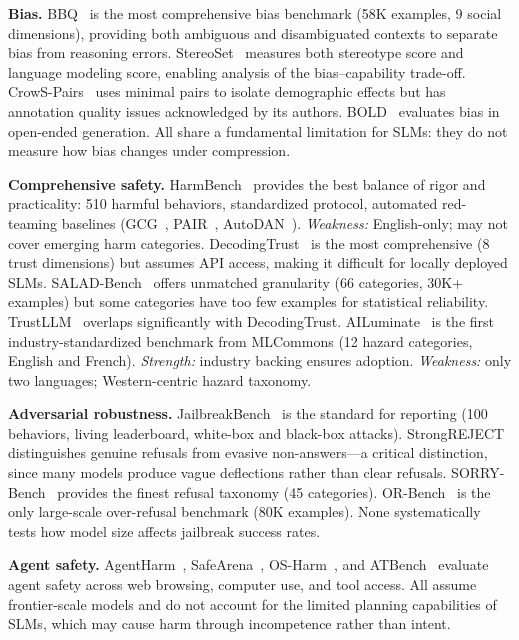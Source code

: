 \documentclass[12pt,a4paper]{article}
\begin{document}
\textbf{Bias.} BBQ~\citep{parrish2022bbq} is the most comprehensive bias benchmark (58K examples, 9 social dimensions), providing both ambiguous and disambiguated contexts to separate bias from reasoning errors. StereoSet~\citep{nadeem2021stereoset} measures both stereotype score and language modeling score, enabling analysis of the bias--capability trade-off. CrowS-Pairs~\citep{nangia2020crows} uses minimal pairs to isolate demographic effects but has annotation quality issues acknowledged by its authors. BOLD~\citep{dhamala2021bold} evaluates bias in open-ended generation. All share a fundamental limitation for SLMs: they do not measure how bias changes under compression.

\textbf{Comprehensive safety.} HarmBench~\citep{mazeika2024harmbench} provides the best balance of rigor and practicality: 510 harmful behaviors, standardized protocol, automated red-teaming baselines (GCG~\citep{zou2023gcg}, PAIR~\citep{chao2023pair}, AutoDAN~\citep{liu2023autodan}). \emph{Weakness:} English-only; may not cover emerging harm categories. DecodingTrust~\citep{wang2023decodingtrust} is the most comprehensive (8 trust dimensions) but assumes API access, making it difficult for locally deployed SLMs. SALAD-Bench~\citep{li2024salad} offers unmatched granularity (66 categories, 30K+ examples) but some categories have too few examples for statistical reliability. TrustLLM~\citep{huang2024trustllm} overlaps significantly with DecodingTrust. AILuminate~\citep{ailuminate2025} is the first industry-standardized benchmark from MLCommons (12 hazard categories, English and French). \emph{Strength:} industry backing ensures adoption. \emph{Weakness:} only two languages; Western-centric hazard taxonomy.

\textbf{Adversarial robustness.} JailbreakBench~\citep{chao2024jailbreakbench} is the standard for reporting (100 behaviors, living leaderboard, white-box and black-box attacks). StrongREJECT~\citep{souly2024strongreject} distinguishes genuine refusals from evasive non-answers---a critical distinction, since many models produce vague deflections rather than clear refusals. SORRY-Bench~\citep{xie2024sorry} provides the finest refusal taxonomy (45 categories). OR-Bench~\citep{cui2024orbench} is the only large-scale over-refusal benchmark (80K examples). None systematically tests how model size affects jailbreak success rates.

\textbf{Agent safety.} AgentHarm~\citep{andriushchenko2024agentharm}, SafeArena~\citep{safearena2025}, OS-Harm~\citep{osharm2025}, and ATBench~\citep{atbench2026} evaluate agent safety across web browsing, computer use, and tool access. All assume frontier-scale models and do not account for the limited planning capabilities of SLMs, which may cause harm through incompetence rather than intent.
\end{document}
